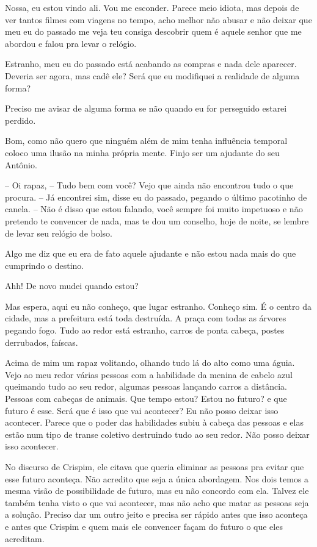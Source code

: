 Nossa, eu estou vindo ali. Vou me esconder. Parece meio idiota, mas depois de ver tantos filmes com viagens no tempo, acho melhor não abusar e não deixar que meu eu do passado me veja
teu consiga descobrir quem é aquele senhor que me abordou e falou pra levar o relógio.

Estranho, meu eu do passado está acabando as compras e nada dele aparecer. Deveria ser agora, mas cadê ele? Será que eu modifiquei a realidade de alguma forma?

Preciso me avisar de alguma forma se não quando eu for perseguido estarei perdido.

Bom, como não quero que ninguém além de mim tenha influência temporal coloco uma ilusão na minha própria mente. Finjo ser um ajudante do seu Antônio.

-- Oi rapaz, 
-- Tudo bem com você? Vejo que ainda não encontrou tudo o que procura.
-- Já encontrei sim, disse eu do passado, pegando o último pacotinho de canela.
-- Não é disso que estou falando, você sempre foi muito impetuoso e não pretendo te convencer de nada, mas te dou um conselho, hoje de noite, se lembre de levar seu relógio de bolso.

Algo me diz que eu era de fato aquele ajudante e não estou nada mais do que cumprindo o destino.

Ahh! De novo mudei quando estou?

Mas espera, aqui eu não conheço, que lugar estranho.
Conheço sim. 
É o centro da cidade, mas a prefeitura está toda destruída. A praça com todas as árvores pegando fogo. Tudo ao redor está estranho, carros de ponta cabeça, postes derrubados, faíscas.

Acima de mim um rapaz volitando, olhando tudo lá do alto como uma águia.
Vejo ao meu redor várias pessoas com a habilidade da menina de cabelo azul queimando tudo ao seu redor, algumas pessoas lançando carros a distância. Pessoas com cabeças de animais. 
Que tempo estou? Estou no futuro? e que futuro é esse.
Será que é isso que vai acontecer? Eu não posso deixar isso acontecer. 
Parece que o poder das habilidades subiu à cabeça das pessoas e elas estão num tipo de transe coletivo destruindo tudo ao seu redor. Não posso deixar isso acontecer.

No discurso de Crispim, ele citava que queria eliminar as pessoas pra evitar que esse futuro aconteça. Não acredito que seja a única abordagem. Nos dois temos a mesma visão de possibilidade de futuro, mas eu não concordo com ela. 
Talvez ele também tenha visto o que vai acontecer, mas não acho que matar as pessoas seja a solução. Preciso dar um outro jeito e precisa ser rápido antes que isso aconteça e antes que Crispim e quem mais ele convencer façam do futuro o que eles acreditam.


